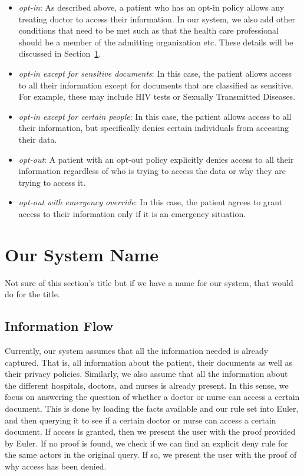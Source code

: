 \documentclass[conference]{IEEEtran}
\begin{document}
\begin{itemize}
 \item \textit{opt-in}: As described above, a patient who has an opt-in policy allows any treating doctor to access their information. In our system, we also
add other conditions that need to be met such as that the health care professional should be a member of the admitting organization etc. These details will be
discussed in Section~\ref{main-sys}.
\item \textit{opt-in except for sensitive documents}: In this case, the patient allows access to all their information except for documents that are classified
as sensitive. For example, these may include HIV tests or Sexually Transmitted Diseases. 
\item \textit{opt-in except for certain people}: In this case, the patient allows access to all their information, but specifically denies certain individuals
from accessing their data.
\item \textit{opt-out}: A patient with an opt-out policy explicitly denies access to all their information regardless of who is trying to access the data or
why they are trying to access it.
\item \textit{opt-out with emergency override}: In this case, the patient agrees to grant access to their information only if it is an emergency situation. 
\end{itemize}

\section{Our System Name}
\label{main-sys}

Not sure of this section's title but if we have a name for our system, that would do for the title. 

\subsection{Information Flow}
\label{info-flow}

Currently, our system assumes that all the information needed is already captured. That is, all information about the patient, their documents as well as their
privacy policies. Similarly, we also assume that all the information about the different hospitals, doctors, and nurses is already present. In this sense, we
focus on answering the question of whether a doctor or nurse can access a certain document. This is done by loading the facts available and our rule set into
Euler, and then querying it to see if a certain doctor or nurse can access a certain document. If access is granted, then we present the user with the proof
provided by Euler. If no proof is found, we check if we can find an explicit deny rule for the same actors in the original query. If so, we present the user
with the proof of why access has been denied.
\end{document}
